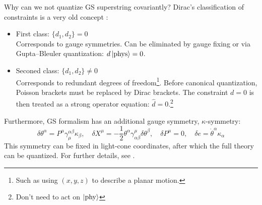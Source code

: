 \documentclass{beamer}
\begin{document}
\begin{frame}[allowframebreaks]{Why can we not quantize GS superstring covariantly?}
	Dirac’s classification of constraints is a very old concept \cite{dirac}:
	\begin{itemize}
		\item {\color{WHU} First class: $\{d_1, d_2\}=0$}\\
		Corresponds to gauge symmetries. Can be eliminated by gauge fixing or via Gupta–Bleuler quantization: $d\ket{\text{phys}} = 0$.
		\item {\color{WHU} Seconed class: $\{d_1,d_2\}\neq 0$}\\
		Corresponds to redundant degrees of freedom\footnote{Such as using $(x, y, z)$ to describe a planar motion.}. Before canonical quantization, Poisson brackets must be replaced by {\color{WHU}Dirac brackets}. The constraint $d = 0$ is then treated as a strong operator equation: $\hat{d} = 0$.\footnote{Don't need to act on $\ket{\text{phy}}$}
	\end{itemize}
	Furthermore, GS formalism has an additional gauge symmetry, {\color{WHU}$\kappa$-symmetry}:
	\begin{equation*}
		\delta\theta^{\alpha}=P^{\mu}\gamma_{\mu}^{\alpha\beta}\kappa_{\beta},\quad\delta X^{\mu}=-\frac{1}{2}\theta^{\alpha}\gamma_{\alpha\beta}^{\mu}\delta\theta^{\beta},\quad\delta P^{\mu}=0,\quad\delta e=\dot{\theta}^{\alpha}\kappa_{\alpha}
	\end{equation*}
	This symmetry can be fixed in light-cone coordinates, after which the full theory can be quantized. For further details, see \cite{Berkovits:2017ldz}.
\end{frame}
\end{document}
